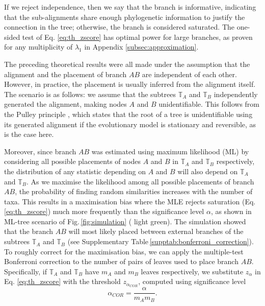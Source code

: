 If we reject independence, then we say that the branch is informative, indicating that the sub-alignments share enough phylogenetic information to justify the connection in the tree; otherwise, the branch is considered saturated. 
The one-sided test of Eq. \eqref{eq:th_zscore} has optimal power for large branches, as proven for any multiplicity of $\lambda_1$ in Appendix \ref{subsec:approximation}.

\medskip

The preceding theoretical results were all made under the assumption that the alignment and the placement of branch $AB$ are independent of each other. However, in practice, the placement is usually inferred from the alignment itself. The scenario is as follows: we assume that the subtrees $\mathbb{T}_A$ and $\mathbb{T}_B$ independently generated the alignment, making nodes $A$ and $B$ unidentifiable. This follows from the Pulley principle , which states that the root of a tree is unidentifiable using its generated alignment if the evolutionary model is stationary and reversible, as is the case here.

Moreover, since branch $AB$ was estimated using maximum likelihood (ML) by considering all possible placements of nodes  $A$ and $B$ in $\mathbb{T}_A$ and $\mathbb{T}_B$ respectively, the distribution of any statistic depending on $A$ and $B$ will also depend on $\mathbb{T}_A$ and $\mathbb{T}_B$. As we maximise the likelihood among all possible placements of branch $AB$, the probability of finding random similarities increases with the number of taxa. This results in a maximisation bias where the MLE rejects saturation (Eq.\,\ref{eq:th_zscore}) much more frequently than the significance level $\alpha$, as shown in ML-tree scenario of Fig.\,\ref{fig:simulation} ({\color{MLtree} light green}).  The simulation showed that the branch $AB$ will most likely placed between external branches of the subtrees $\mathbb{T}_A$ and $\mathbb{T}_B$ (see Supplementary Table\,\ref{supptab:bonferroni_correction}). To roughly correct for the maximisation bias, we can apply the multiple-test Bonferroni correction to the number of pairs of leaves used to place branch $AB$. Specifically, if $\mathbb{T}_A$ and $\mathbb{T}_B$ have $m_A$ and $m_B$ leaves respectively, we substitute $z_\alpha$ in Eq. \eqref{eq:th_zscore}  with the threshold ${z_{\alpha_{COR}}}$, computed using significance level \begin{equation} \label{eq:corrected_significance}
\alpha_{COR} =  \frac{\alpha}{m_Am_B}.
\end{equation}

